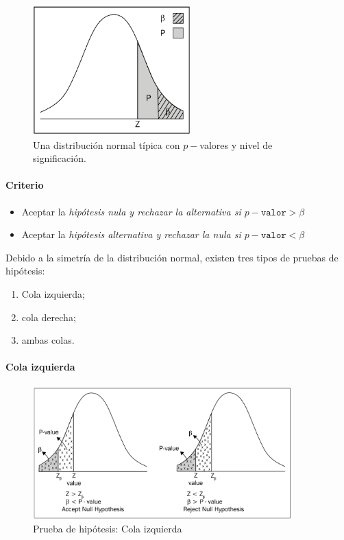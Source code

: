 \begin{figure}
 \centering
 \includegraphics[height=5cm,keepaspectratio=true]{./images/kum0402.png}
 \caption{Una distribución normal típica con $p-$valores y nivel de significación.}
 \label{fig:0402}
\end{figure}


\paragraph{Criterio}
\begin{itemize}
 \item Aceptar la \emph{hipótesis nula y rechazar la alternativa si $p-\texttt{valor}>\beta$}
 \item Aceptar la \emph{hipótesis alternativa y rechazar la nula si $p-\texttt{valor}<\beta$}
\end{itemize}



Debido a la simetría de la distribución normal, existen tres tipos de pruebas de hipótesis:
\begin{enumerate}
 \item Cola izquierda;
 \item cola derecha;
 \item ambas colas.
\end{enumerate}


\paragraph{Cola izquierda}
\begin{figure}
 \centering
 \includegraphics[width=10cm,keepaspectratio=true]{./images/kum0403.png}
 \caption{Prueba de hipótesis: Cola izquierda}
 \label{kum0403}
\end{figure}


